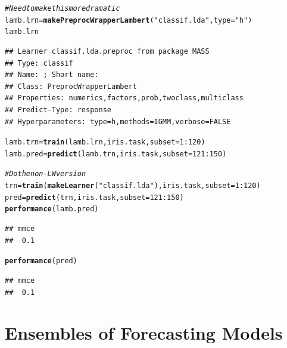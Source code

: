 \documentclass{article}\usepackage[]{graphicx}\usepackage[]{color}
\makeatletter
\newcommand{\hlnum}[1]{\textcolor[rgb]{0.686,0.059,0.569}{#1}}%
\newcommand{\hlstr}[1]{\textcolor[rgb]{0.192,0.494,0.8}{#1}}%
\newcommand{\hlcom}[1]{\textcolor[rgb]{0.678,0.584,0.686}{\textit{#1}}}%
\newcommand{\hlopt}[1]{\textcolor[rgb]{0,0,0}{#1}}%
\newcommand{\hlstd}[1]{\textcolor[rgb]{0.345,0.345,0.345}{#1}}%
\newcommand{\hlkwb}[1]{\textcolor[rgb]{0.69,0.353,0.396}{#1}}%
\newcommand{\hlkwc}[1]{\textcolor[rgb]{0.333,0.667,0.333}{#1}}%
\newcommand{\hlkwd}[1]{\textcolor[rgb]{0.737,0.353,0.396}{\textbf{#1}}}%
\newenvironment{kframe}{%
 \def\at@end@of@kframe{}%
 \ifinner\ifhmode%
  \def\at@end@of@kframe{\end{minipage}}%
  \begin{minipage}{\columnwidth}%
 \fi\fi%
 \def\FrameCommand##1{\hskip\@totalleftmargin \hskip-\fboxsep
 \colorbox{shadecolor}{##1}\hskip-\fboxsep
     \hskip-\linewidth \hskip-\@totalleftmargin \hskip\columnwidth}%
 \MakeFramed {\advance\hsize-\width
   \@totalleftmargin\z@ \linewidth\hsize
   \@setminipage}}%
 {\par\unskip\endMakeFramed%
 \at@end@of@kframe}
\newenvironment{knitrout}{}{} %
\theoremstyle{definition}
\makeatother
\begin{document}
\begin{knitrout}
\color{fgcolor}\begin{kframe}
\begin{alltt}
\hlcom{# Need to make this more dramatic}
\hlstd{lamb.lrn} \hlkwb{=} \hlkwd{makePreprocWrapperLambert}\hlstd{(}\hlstr{"classif.lda"}\hlstd{,} \hlkwc{type} \hlstd{=} \hlstr{"h"}\hlstd{)}
\hlstd{lamb.lrn}
\end{alltt}
\begin{verbatim}
## Learner classif.lda.preproc from package MASS
## Type: classif
## Name: ; Short name: 
## Class: PreprocWrapperLambert
## Properties: numerics,factors,prob,twoclass,multiclass
## Predict-Type: response
## Hyperparameters: type=h,methods=IGMM,verbose=FALSE
\end{verbatim}
\begin{alltt}
\hlstd{lamb.trn} \hlkwb{=} \hlkwd{train}\hlstd{(lamb.lrn,iris.task,} \hlkwc{subset} \hlstd{=} \hlnum{1}\hlopt{:}\hlnum{120}\hlstd{)}
\hlstd{lamb.pred} \hlkwb{=} \hlkwd{predict}\hlstd{(lamb.trn, iris.task,} \hlkwc{subset} \hlstd{=} \hlnum{121}\hlopt{:}\hlnum{150}\hlstd{)}

\hlcom{# Do the non-LW version}
\hlstd{trn} \hlkwb{=} \hlkwd{train}\hlstd{(}\hlkwd{makeLearner}\hlstd{(}\hlstr{"classif.lda"}\hlstd{),iris.task,} \hlkwc{subset} \hlstd{=} \hlnum{1}\hlopt{:}\hlnum{120}\hlstd{)}
\hlstd{pred} \hlkwb{=} \hlkwd{predict}\hlstd{(trn, iris.task,} \hlkwc{subset} \hlstd{=} \hlnum{121}\hlopt{:}\hlnum{150}\hlstd{)}
\hlkwd{performance}\hlstd{(lamb.pred)}
\end{alltt}
\begin{verbatim}
## mmce 
##  0.1
\end{verbatim}
\begin{alltt}
\hlkwd{performance}\hlstd{(pred)}
\end{alltt}
\begin{verbatim}
## mmce 
##  0.1
\end{verbatim}
\end{kframe}
\end{knitrout}


\section{Ensembles of Forecasting Models}
\end{document}
